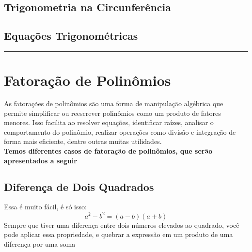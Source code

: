 \documentclass{article}
\begin{document}
\subsection{Trigonometria na Circunferência}

\subsection{Equações Trigonométricas}

\vspace{15pt}
\hrule

\section{Fatoração de Polinômios}
As fatorações de polinômios são uma forma de manipulação algébrica que permite simplificar ou reescrever polinômios como um produto de fatores menores. Isso facilita ao resolver equações, identificar raízes, analisar o comportamento do polinômio, realizar operações como divisão e integração de forma mais eficiente, dentre outras muitas utilidades.
\\[10pt]
\textbf{Temos diferentes casos de fatoração de polinômios, que serão apresentados a seguir}
\subsection{Diferença de Dois Quadrados}
Essa é muito fácil, é só isso:
\[
a^2 - b^2 = (a - b)(a + b)
\]
Sempre que tiver uma diferença entre dois números elevados ao quadrado, você pode aplicar essa propriedade, e quebrar a expressão em um produto de uma diferença por uma soma
\end{document}
